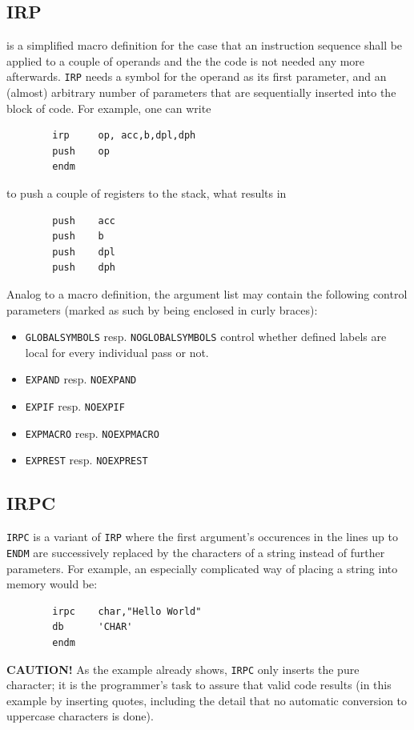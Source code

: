 \documentclass[12pt,twoside]{report}
\makeatletter
\newcommand{\bb}[1]{{\bf #1}}
\newcommand{\tty}[1]{{\tt #1}}
\newcommand{\ttindex}[1]{\index{#1@{\tt #1}}}
\makeatother
\begin{document}

\subsection{IRP}
\ttindex{IRP}

is a simplified macro definition for the case that an instruction sequence
shall be applied to a couple of operands and the the code is not needed
any more afterwards.  \tty{IRP} needs a symbol for the operand as its
first parameter, and an (almost) arbitrary number of parameters that are
sequentially inserted into the block of code.  For example, one can write
\begin{verbatim}
        irp     op, acc,b,dpl,dph
        push    op
        endm
\end{verbatim}
to push a couple of registers to the stack, what results in
\begin{verbatim}
        push    acc
        push    b
        push    dpl
        push    dph
\end{verbatim}
Analog to a macro definition, the argument list may contain the
following control parameters (marked as such by being enclosed in curly
braces):
\begin{itemize}
\item{\tty{GLOBALSYMBOLS} resp. \tty{NOGLOBALSYMBOLS} control whether
      defined labels are local for every individual pass or not.}
\item{\tty{EXPAND} resp. \tty{NOEXPAND}}
\item{\tty{EXPIF} resp. \tty{NOEXPIF}}
\item{\tty{EXPMACRO} resp. \tty{NOEXPMACRO}}
\item{\tty{EXPREST} resp. \tty{NOEXPREST}}
\end{itemize}



\subsection{IRPC}
\ttindex{IRPC}

\tty{IRPC} is a variant of \tty{IRP} where the first argument's occurences
in the lines up to \tty{ENDM} are successively replaced by the characters
of a string instead of further parameters.  For example, an especially
complicated way of placing a string into memory would be:
\begin{verbatim}
        irpc    char,"Hello World"
        db      'CHAR'
        endm
\end{verbatim}
\bb{CAUTION!} As the example already shows, \tty{IRPC} only inserts the
pure character; it is the programmer's task to assure that valid code
results (in this example by inserting quotes, including the detail that no
automatic conversion to uppercase characters is done).
\end{document}

